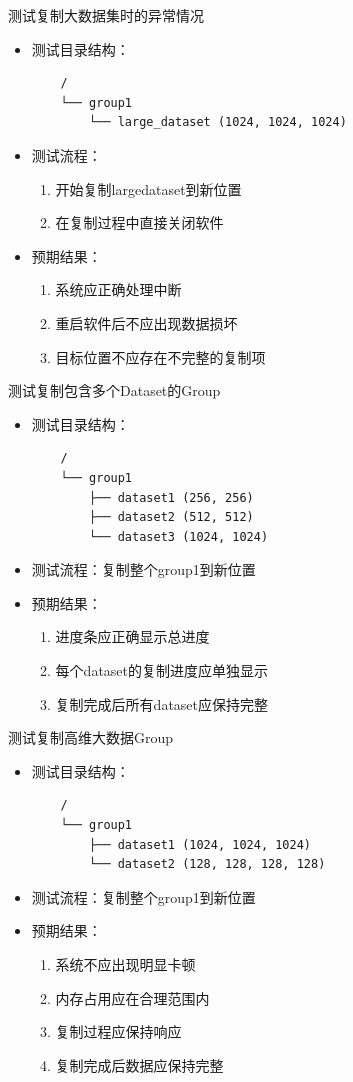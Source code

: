 \documentclass[a4paper,12pt]{report}	%
\begin{document}
测试复制大数据集时的异常情况
\begin{itemize}
    \item 测试目录结构：
    \begin{verbatim}
    /
    └── group1
        └── large_dataset (1024, 1024, 1024)
    \end{verbatim}
    \item 测试流程：
    \begin{enumerate}
        \item 开始复制large\textunderscore dataset到新位置
        \item 在复制过程中直接关闭软件
    \end{enumerate}
    \item 预期结果：
    \begin{enumerate}
        \item 系统应正确处理中断
        \item 重启软件后不应出现数据损坏
        \item 目标位置不应存在不完整的复制项
    \end{enumerate}
\end{itemize}

测试复制包含多个Dataset的Group
\begin{itemize}
    \item 测试目录结构：
    \begin{verbatim}
    /
    └── group1
        ├── dataset1 (256, 256)
        ├── dataset2 (512, 512)
        └── dataset3 (1024, 1024)
    \end{verbatim}
    \item 测试流程：复制整个group1到新位置
    \item 预期结果：
    \begin{enumerate}
        \item 进度条应正确显示总进度
        \item 每个dataset的复制进度应单独显示
        \item 复制完成后所有dataset应保持完整
    \end{enumerate}
\end{itemize}

测试复制高维大数据Group
\begin{itemize}
    \item 测试目录结构：
    \begin{verbatim}
    /
    └── group1
        ├── dataset1 (1024, 1024, 1024)
        └── dataset2 (128, 128, 128, 128)
    \end{verbatim}
    \item 测试流程：复制整个group1到新位置
    \item 预期结果：
    \begin{enumerate}
        \item 系统不应出现明显卡顿
        \item 内存占用应在合理范围内
        \item 复制过程应保持响应
        \item 复制完成后数据应保持完整
    \end{enumerate}
\end{itemize}
\end{document}
